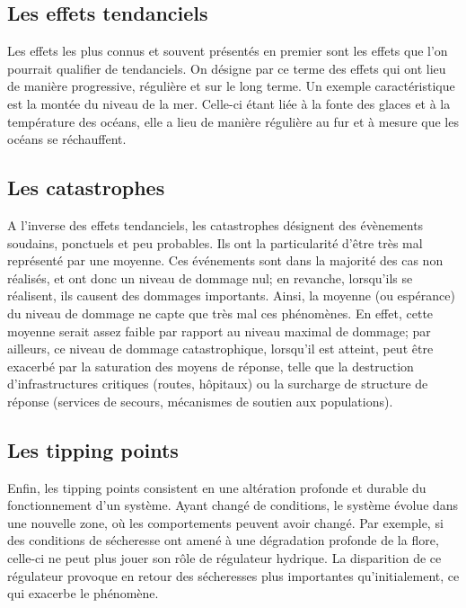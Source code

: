 \subsection{Les effets tendanciels}
\label{sect/1/1/1}


Les effets les plus connus et souvent présentés en premier sont les effets que l'on pourrait qualifier de tendanciels. On désigne par ce terme des effets qui ont lieu de manière progressive, régulière et sur le long terme. Un exemple caractéristique est la montée du niveau de la mer. Celle-ci étant liée à la fonte des glaces et à la température des océans, elle a lieu de manière régulière au fur et à mesure que les océans se réchauffent. 



\subsection{Les catastrophes}
\label{sect/1/1/2}

A l'inverse des effets tendanciels, les catastrophes désignent des évènements soudains, ponctuels et peu probables. Ils ont la particularité d'être très mal représenté par une moyenne. Ces événements sont dans la majorité des cas non réalisés, et ont donc un niveau de dommage nul; en revanche, lorsqu'ils se réalisent, ils causent des dommages importants. Ainsi, la moyenne (ou espérance) du niveau de dommage ne capte que très mal ces phénomènes. En effet, cette moyenne serait assez faible par rapport au niveau maximal de dommage; par ailleurs, ce niveau de dommage catastrophique, lorsqu'il est atteint, peut être exacerbé par la saturation des moyens de réponse, telle que la destruction d'infrastructures critiques (routes, hôpitaux) ou la surcharge de structure de réponse (services de secours, mécanismes de soutien aux populations). 

\subsection{Les tipping points}
\label{sect/1/1/3}

Enfin, les \glspl{tipping point} consistent en une altération profonde et durable du fonctionnement d'un système. Ayant changé de conditions, le système évolue dans une nouvelle zone, où les comportements peuvent avoir changé. Par exemple, si des conditions de sécheresse ont amené à une dégradation profonde de la flore, celle-ci ne peut plus jouer son rôle de régulateur hydrique. La disparition de ce régulateur provoque en retour des sécheresses plus importantes qu'initialement, ce qui exacerbe le phénomène. 

